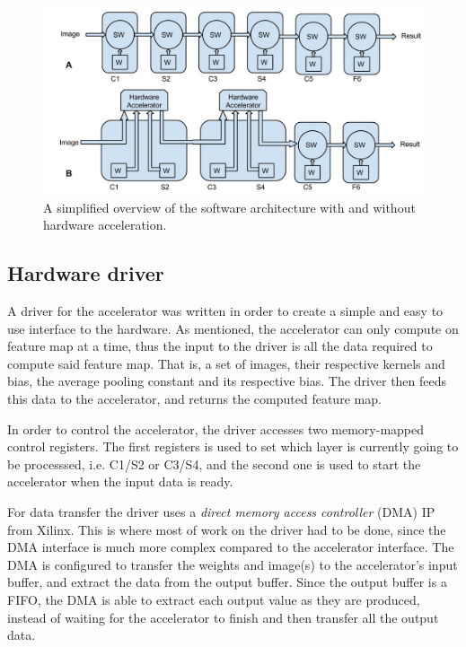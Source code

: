 \begin{figure}[h!]
  \centering
      \includegraphics[width=1.0\textwidth]{Figures/Method/SoftwareArchitecture}
    \caption{A simplified overview of the software architecture with and without hardware acceleration.}
    \label{fig_software_architecture}
\end{figure}

\subsection{Hardware driver}

A driver for the accelerator was written in order to create a simple and easy to use interface to the hardware. As mentioned, the accelerator can only compute on feature map at a time, thus the input to the driver is all the data required to compute said feature map. That is, a set of images, their respective kernels and bias, the average pooling constant and its respective bias. The driver then feeds this data to the accelerator, and returns the computed feature map. 

In order to control the accelerator, the driver accesses two memory-mapped control registers. The first registers is used to set which layer is currently going to be processsed, i.e. C1/S2 or C3/S4, and the second one is used to start the accelerator when the input data is ready. 

For data transfer the driver uses a \textit{direct memory access controller} (DMA) IP from Xilinx. This is where most of work on the driver had to be done, since the DMA interface is much more complex compared to the accelerator interface. The DMA is configured to transfer the weights and image(s) to the accelerator's input buffer, and extract the data from the output buffer. Since the output buffer is a FIFO, the DMA is able to extract each output value as they are produced, instead of waiting for the accelerator to finish and then transfer all the output data. 


